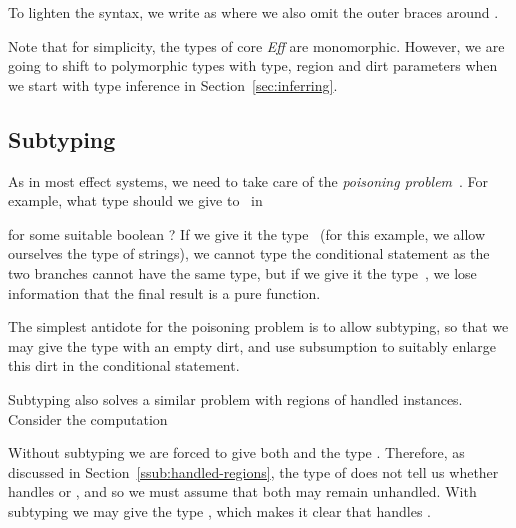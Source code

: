 \documentclass{LMCS}
\newcommand{\Eff}{\emph{Eff}\xspace}
\begin{document}
To lighten the syntax, we write  as 
where we also omit the outer braces around .

Note that for simplicity, the types of core \Eff are monomorphic.
However, we are going to shift to polymorphic types with type, region and dirt parameters
when we start with type inference in Section~\ref{sec:inferring}.


\subsection{Subtyping}
\label{sub:subtyping}

As in most effect systems,
we need to take care of the \emph{poisoning problem}~\cite{wansbrough1999once}.
For example, what type should we give to~ in

for some suitable boolean ?
If we give it the type~
(for this example, we allow ourselves the type  of strings),
we cannot type the conditional statement as the two branches cannot have the same type,
but if we give it the type~,
we lose information that the final result is a pure function.

The simplest antidote for the poisoning problem is to allow subtyping,
so that we may give  the type with an empty dirt,
and use subsumption to suitably enlarge this dirt in the conditional statement.

Subtyping also solves a similar problem with regions of handled instances.
Consider the computation

Without subtyping we are forced to give both  and  the type .
Therefore, as discussed in Section~\ref{ssub:handled-regions},
the type of  does not tell us whether  handles
 or , and so we must assume that both may remain unhandled.
With subtyping we may give  the type , which makes it clear that  handles .
\end{document}
